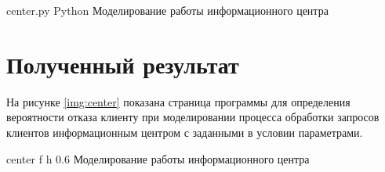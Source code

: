     {center.py}
    {Python}
    {Моделирование работы информационного центра}

\section{Полученный результат}

На рисунке \ref{img:center} показана страница программы для определения вероятности отказа клиенту при моделировании процесса обработки запросов клиентов информационным центром с заданными в условии параметрами.

    {center}
    {f}
    {h}
    {0.6\textwidth}
    {Моделирование работы информационного центра}


